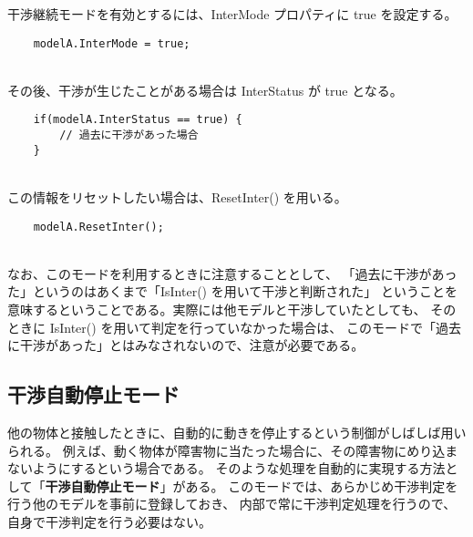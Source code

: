 干渉継続モードを有効とするには、InterMode プロパティに true を設定する。
\\
\begin{breakbox}
\begin{verbatim}
    modelA.InterMode = true;
\end{verbatim}
\end{breakbox}
~ \\
その後、干渉が生じたことがある場合は InterStatus が true となる。
\\
\begin{breakbox}
\begin{verbatim}
    if(modelA.InterStatus == true) {
        // 過去に干渉があった場合
    }
\end{verbatim}
\end{breakbox}
~ \\
この情報をリセットしたい場合は、ResetInter() を用いる。
\\
\begin{breakbox}
\begin{verbatim}
    modelA.ResetInter();
\end{verbatim}
\end{breakbox}
~ \\
なお、このモードを利用するときに注意することとして、
「過去に干渉があった」というのはあくまで「IsInter() を用いて干渉と判断された」
ということを意味するということである。実際には他モデルと干渉していたとしても、
そのときに IsInter() を用いて判定を行っていなかった場合は、
このモードで「過去に干渉があった」とはみなされないので、注意が必要である。

\subsection{干渉自動停止モード}
他の物体と接触したときに、自動的に動きを停止するという制御がしばしば用いられる。
例えば、動く物体が障害物に当たった場合に、その障害物にめり込まないようにするという場合である。
そのような処理を自動的に実現する方法として「\textbf{干渉自動停止モード}」がある。
このモードでは、あらかじめ干渉判定を行う他のモデルを事前に登録しておき、
内部で常に干渉判定処理を行うので、自身で干渉判定を行う必要はない。

